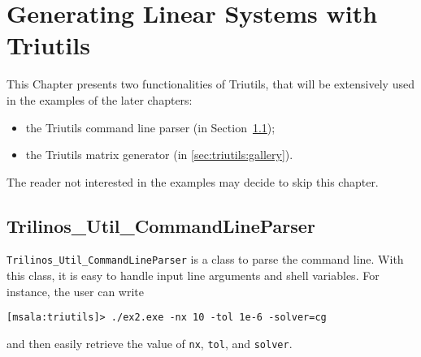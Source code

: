 % 
% 
% 
%  
%  
% 

\section{Generating Linear Systems with Triutils}
\label{chap:triutils}

This Chapter presents two functionalities of Triutils, that will be
extensively used in the examples of the later chapters: 
\begin{itemize}
\item the Triutils command line parser (in
  Section~\ref{sec:triutils:CLP});
\item the Triutils matrix generator (in \ref{sec:triutils:gallery}).
\end{itemize}
The reader not interested in the examples may decide to skip this chapter.


\subsection{Trilinos\_Util\_CommandLineParser}
\label{sec:triutils:CLP}

\verb!Trilinos_Util_CommandLineParser! is a class to parse the command
line.  With this class, it is easy to handle
input line arguments and shell variables. For instance, the user can
write
\begin{verbatim}
[msala:triutils]> ./ex2.exe -nx 10 -tol 1e-6 -solver=cg
\end{verbatim}
and then easily retrieve the value of {\tt nx}, {\tt tol}, and {\tt solver}.
 
